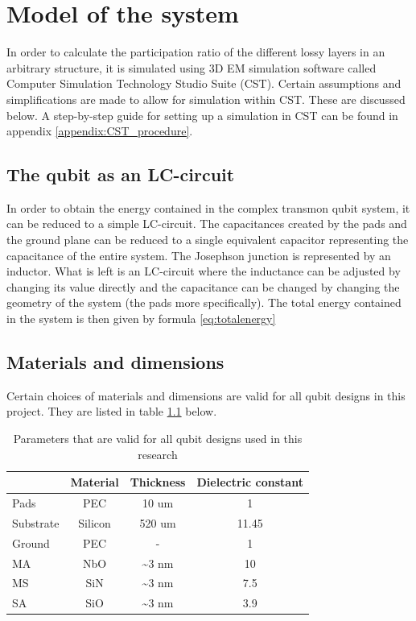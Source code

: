 \chapter{Model of the system}
In order to calculate the participation ratio of the different lossy layers in an arbitrary structure, it is simulated using 3D EM simulation software called Computer Simulation Technology Studio Suite (CST). Certain assumptions and simplifications are made to allow for simulation within CST. These are discussed below. A step-by-step guide for setting up a simulation in CST can be found in appendix \ref{appendix:CST_procedure}.

\section{The qubit as an LC-circuit}
In order to obtain the energy contained in the complex transmon qubit system, it can be reduced to a simple LC-circuit. The capacitances created by the pads and the ground plane can be reduced to a single equivalent capacitor representing the capacitance of the entire system. The Josephson junction is represented by an inductor. What is left is an LC-circuit where the inductance can be adjusted by changing its value directly and the capacitance can be changed by changing the geometry of the system (the pads more specifically). The total energy contained in the system is then given by formula \eqref{eq:totalenergy}

\section{Materials and dimensions}
Certain choices of materials and dimensions are valid for all qubit designs in this project. They are listed in table \ref{table:standard_parameters} below.

\begin{table}
	\begin{center}
		\begin{tabular}{ | l || c | c | c |}
			\hline
			 & Material & Thickness & Dielectric constant \\ \hline
			Pads & PEC & 10 um & 1 \\
			Substrate & Silicon & 520 um & 11.45 \\
			Ground & PEC & - & 1 \\
			MA & NbO & \textasciitilde 3 nm & 10 \\
			MS & SiN & \textasciitilde 3 nm & 7.5 \\
			SA & SiO & \textasciitilde 3 nm & 3.9 \\
			\hline
		\end{tabular}
	\end{center}
	\caption{Parameters that are valid for all qubit designs used in this research}
	\label{table:standard_parameters}
\end{table}


